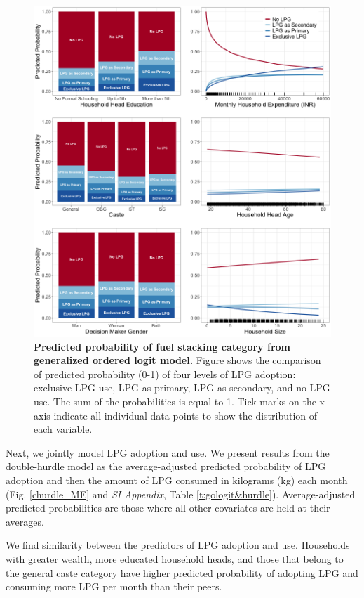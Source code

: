 \documentclass[11pt,english]{article}
\theoremstyle{plain} \newtheorem{claim}{Claim}
\theoremstyle{plain} \newtheorem{prop}{Proposition}
\theoremstyle{plain} \newtheorem{hypo}{Hypothesis}
\begin{document}
\begin{figure}[h!]
\centering
\includegraphics[scale=0.55]{Figures/Marginal_Effects/gologit_rugs.png}
\caption{\textbf{Predicted probability of fuel stacking category from generalized ordered logit model.} Figure shows the comparison of predicted probability (0-1) of four levels of LPG adoption: exclusive LPG use, LPG as primary, LPG as secondary, and no LPG use. The sum of the probabilities is equal to 1. Tick marks on the x-axis indicate all individual data points to show the distribution of each variable.}
\label{f:gologit_ME}
\end{figure}

Next, we jointly model LPG adoption and use. We present results from the double-hurdle model as the average-adjusted predicted probability of LPG adoption and then the amount of LPG consumed in kilograms (kg) each month (Fig. \ref{churdle_ME} and \textit{SI Appendix}, Table \ref{t:gologit&hurdle}). Average-adjusted predicted probabilities are those where all other covariates are held at their averages.

We find similarity between the predictors of LPG adoption and use. Households with greater wealth, more educated household heads, and those that belong to the general caste category have higher predicted probability of adopting LPG and consuming more LPG per month than their peers. 
\end{document}
